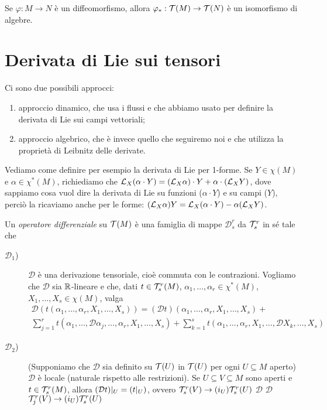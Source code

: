 Se $\varphi:M\to N$ è un diffeomorfismo, allora $\varphi_*: \mathcal T(M) \to \mathcal T(N)$ è un isomorfismo di algebre.

\section{Derivata di Lie sui tensori}

Ci sono due possibili approcci:
\begin{enumerate}
	\item approccio dinamico, che usa i flussi e che abbiamo usato per definire la derivata di Lie sui campi vettoriali;
	\item approccio algebrico, che è invece quello che seguiremo noi e che utilizza la proprietà di Leibnitz delle derivate.
\end{enumerate}

\begin{example}
	Vediamo come definire per esempio la derivata di Lie per 1-forme.
	Se $Y\in\chi(M)$ e $\alpha\in\chi^*(M)$, richiediamo che $\mathcal L_X(\alpha \cdot Y) = (\mathcal L_X \alpha)\cdot Y + \alpha \cdot (\mathcal L_X Y)$, dove sappiamo cosa vuol dire la derivata di Lie su funzioni ($\alpha\cdot Y$) e su campi ($Y$), perciò la ricaviamo anche per le forme: $(\mathcal L_X\alpha)Y = \mathcal L_X(\alpha\cdot Y) - \alpha(\mathcal L_XY)$.
\end{example}

\begin{definition} 
	Un \emph{operatore differenziale} su $\mathcal T(M)$ è una famiglia di mappe $\mathcal D_s^r$ da $\mathcal T_s^r$ in sé tale che
	\begin{description}
	 \item [$\mathcal D_1$)] $\mathcal D$ è una derivazione tensoriale, cioè commuta con le contrazioni.
	 Vogliamo che $\mathcal D$ sia $\mathbb R$-lineare e che, dati $t\in\mathcal T_s^r(M)$, $\alpha_1,\ldots,\alpha_r\in\chi^*(M)$, $X_1,\ldots,X_s\in\chi(M)$, valga
	 \begin{multline*}
	 	\mathcal D (t(\alpha_1,\ldots,\alpha_r,X_1,\ldots,X_s)) = (\mathcal D t) (\alpha_1,\ldots,\alpha_r,X_1,\ldots,X_s) +\\
	 	\sum_{j=1}^r t(\alpha_1,\ldots,\mathcal D \alpha_j,\ldots, \alpha_r, X_1,\ldots, X_s) +
	 	\sum_{k=1}^s t(\alpha_1,\ldots, \alpha_r, X_1,\ldots, \mathcal D X_k,\ldots, X_s)
	 \end{multline*}

	\item [$\mathcal D_2$)] (Supponiamo che $\mathcal D$ sia definito su $\mathcal T(U)$ in $\mathcal T(U)$ per ogni $U\subseteq M$ aperto) $\mathcal D$ è locale (naturale rispetto alle restrizioni). Se $U\subseteq V \subseteq M$ sono aperti e $t\in\mathcal T_s^r(M)$, allora $(\mathcal D t)|_ U = \mathcal (t|_ U)$, ovvero
	$\mathcal T_s^r(V) \to (i_U) \mathcal T_s^r(U)$
	$\mathcal D$ $\mathcal D$
	$\mathcal T_j^r(V) \to (i_U) \mathcal T_s^r(U)$
	\end{description}
\end{definition}

